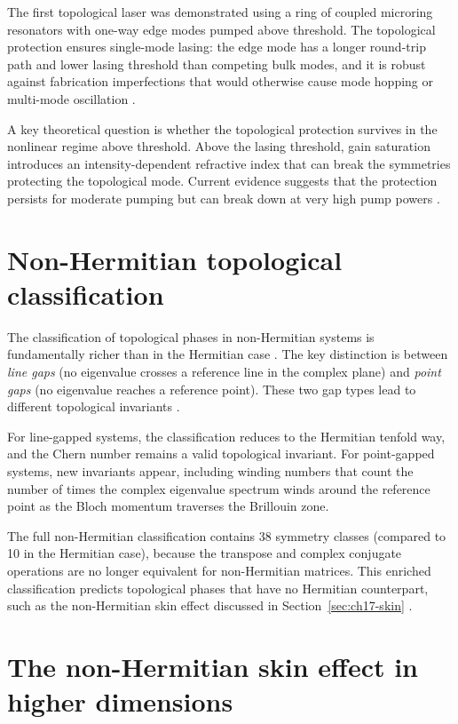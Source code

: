 The first topological laser was demonstrated using a ring of coupled
microring resonators with one-way edge modes pumped above threshold.
The topological protection ensures single-mode lasing: the edge mode
has a longer round-trip path and lower lasing threshold than competing
bulk modes, and it is robust against fabrication imperfections that
would otherwise cause mode hopping or multi-mode oscillation
\cite{ozawa2018topological,price2022roadmap}.

A key theoretical question is whether the topological protection
survives in the nonlinear regime above threshold.  Above the lasing
threshold, gain saturation introduces an intensity-dependent
refractive index that can break the symmetries protecting the
topological mode.  Current evidence suggests that the protection
persists for moderate pumping but can break down at very high pump
powers \cite{li2022gain,zhu2020photonic}.

\section{Non-Hermitian topological classification}
\label{sec:ch17-classification}

The classification of topological phases in non-Hermitian systems is
fundamentally richer than in the Hermitian case \cite{kawabata2019classification}.  The key distinction
is between \emph{line gaps} (no eigenvalue crosses a reference line
in the complex plane) and \emph{point gaps} (no eigenvalue reaches a
reference point).  These two gap types lead to different topological
invariants \cite{gong2018topologicala}.

For line-gapped systems, the classification reduces to the Hermitian
tenfold way, and the Chern number remains a valid topological
invariant.  For point-gapped systems, new invariants appear,
including winding numbers that count the number of times the complex
eigenvalue spectrum winds around the reference point as the Bloch
momentum traverses the Brillouin zone.

The full non-Hermitian classification contains 38 symmetry classes
(compared to 10 in the Hermitian case), because the transpose and
complex conjugate operations are no longer equivalent for non-Hermitian
matrices.  This enriched classification predicts topological phases
that have no Hermitian counterpart, such as the non-Hermitian skin
effect discussed in Section~\ref{sec:ch17-skin}
\cite{gong2018topologicala,lee2016anomalous}.

\section{The non-Hermitian skin effect in higher dimensions}
\label{sec:ch17-skin-higher-dim}

